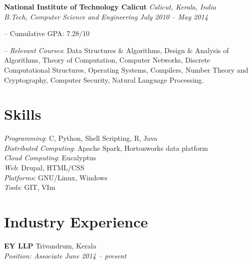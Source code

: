 \documentclass[margin,line]{resume}
\begin{document}
\begin{resume}
    \textbf{National Institute of Technology Calicut} \hfill \textit{Calicut, Kerala, India} \vspace{1mm}\\\vspace{1mm}%
    \textsl{B.Tech, Computer Science and Engineering} \hfill \textit{ July 2010 -- May 2014}\vspace{-3mm}\\\vspace{-1mm}%
    \begin{list2}
        \item[--] Cumulative GPA: 7.28/10 
        \item[--] \textit{Relevant Courses}: Data Structures \& Algorithms, Design \& Analysis of Algorithms, Theory
of Computation, Computer Networks, Discrete Computational Structures, Operating Systems, 
Compilers, Number Theory and Cryptography, Computer Security, Natural Language Processing.
    \end{list2}\vspace{-1.5mm}
    
 \vspace{3mm}

   \section{\mysidestyle Skills} 

 \textit{Programming}: C, Python, Shell Scripting, R, Java \\
 \textit{Distributed Computing}: Apache Spark, Hortonworks data platform \\
 \textit{Cloud Computing}: Eucalyptus	\\
 \textit{Web}: Drupal, HTML/CSS	\\
	 \textit{Platforms}: GNU/Linux, Windows \\
	 \textit{Tools}: GIT, VIm \\



    \section{\mysidestyle Industry Experience}


    \textbf{EY LLP } 				\hfill  Trivandrum, Kerala \\
      \textit{Position: Associate } 			\hfill \textit{June 2014 -- present}
  


\end{resume}
\end{document}
